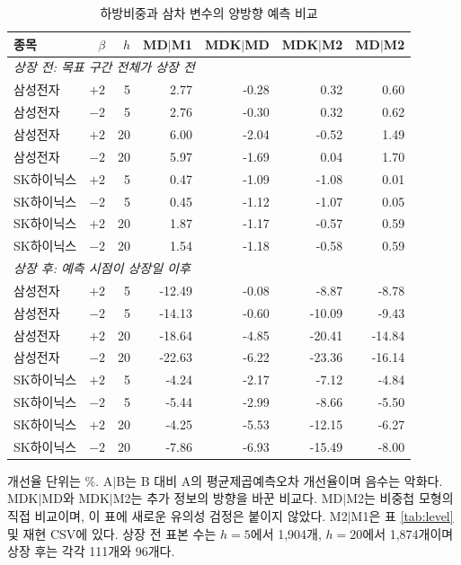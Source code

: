 \begin{table}[htbp]\centering\small
\caption{하방비중과 삼차 변수의 양방향 예측 비교}\label{tab:downside}
\begin{tabular}{lrrrrrr}\toprule
종목 & $\beta$ & $h$ & MD$|$M1 & MDK$|$MD & MDK$|$M2 & MD$|$M2\\\midrule
\multicolumn{7}{l}{\textit{상장 전: 목표 구간 전체가 상장 전}}\\
삼성전자 & $+2$ & 5 & 2.77 & -0.28 & 0.32 & 0.60\\
삼성전자 & $-2$ & 5 & 2.76 & -0.30 & 0.32 & 0.62\\
삼성전자 & $+2$ & 20 & 6.00 & -2.04 & -0.52 & 1.49\\
삼성전자 & $-2$ & 20 & 5.97 & -1.69 & 0.04 & 1.70\\
SK하이닉스 & $+2$ & 5 & 0.47 & -1.09 & -1.08 & 0.01\\
SK하이닉스 & $-2$ & 5 & 0.45 & -1.12 & -1.07 & 0.05\\
SK하이닉스 & $+2$ & 20 & 1.87 & -1.17 & -0.57 & 0.59\\
SK하이닉스 & $-2$ & 20 & 1.54 & -1.18 & -0.58 & 0.59\\
\midrule
\multicolumn{7}{l}{\textit{상장 후: 예측 시점이 상장일 이후}}\\
삼성전자 & $+2$ & 5 & -12.49 & -0.08 & -8.87 & -8.78\\
삼성전자 & $-2$ & 5 & -14.13 & -0.60 & -10.09 & -9.43\\
삼성전자 & $+2$ & 20 & -18.64 & -4.85 & -20.41 & -14.84\\
삼성전자 & $-2$ & 20 & -22.63 & -6.22 & -23.36 & -16.14\\
SK하이닉스 & $+2$ & 5 & -4.24 & -2.17 & -7.12 & -4.84\\
SK하이닉스 & $-2$ & 5 & -5.44 & -2.99 & -8.66 & -5.50\\
SK하이닉스 & $+2$ & 20 & -4.25 & -5.53 & -12.15 & -6.27\\
SK하이닉스 & $-2$ & 20 & -7.86 & -6.93 & -15.49 & -8.00\\
\bottomrule\end{tabular}
\smallskip
\begin{minipage}{0.97\textwidth}\footnotesize 개선율 단위는 \%. A$|$B는 B 대비 A의 평균제곱예측오차 개선율이며 음수는 악화다. MDK$|$MD와 MDK$|$M2는 추가 정보의 방향을 바꾼 비교다. MD$|$M2는 비중첩 모형의 직접 비교이며, 이 표에 새로운 유의성 검정은 붙이지 않았다. M2$|$M1은 표 \ref{tab:level} 및 재현 CSV에 있다. 상장 전 표본 수는 $h=5$에서 1,904개, $h=20$에서 1,874개이며 상장 후는 각각 111개와 96개다.\end{minipage}
\end{table}
